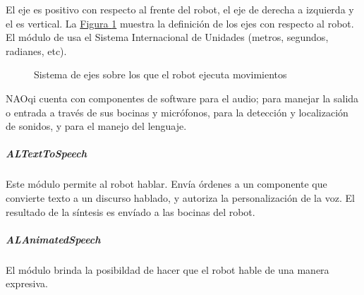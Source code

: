 
El eje  es positivo con respecto al frente del robot, el eje  de
derecha a izquierda y el  es vertical.
La \hyperref[\detokenize{chapter_one/naoqi:almotionaxis}]{Figura \ref{\detokenize{chapter_one/naoqi:almotionaxis}}} muestra la definición de los ejes con respecto al robot.
El módulo de  usa el Sistema Internacional de Unidades (metros,
segundos, radianes, etc).
\begin{figure}[htbp]
\centering
\capstart

\noindent{}
\caption{Sistema de ejes sobre los que el robot ejecuta movimientos}\label{\detokenize{chapter_one/naoqi:almotionaxis}}\end{figure}




NAOqi cuenta con componentes de software para el audio; para
manejar la salida o entrada a través de sus bocinas y micrófonos,
para la detección y localización de sonidos,  y para el manejo del lenguaje.


\subparagraph{ALTextToSpeech}
\label{\detokenize{chapter_one/naoqi:altexttospeech}}
Este módulo permite al robot hablar. Envía órdenes a un componente que
convierte texto a un discurso hablado, y autoriza la personalización de la voz.
El resultado de la síntesis es envíado a las bocinas del robot.


\subparagraph{ALAnimatedSpeech}
\label{\detokenize{chapter_one/naoqi:alanimatedspeech}}
El módulo  brinda la posibildad de hacer que el robot hable
de una manera expresiva.

